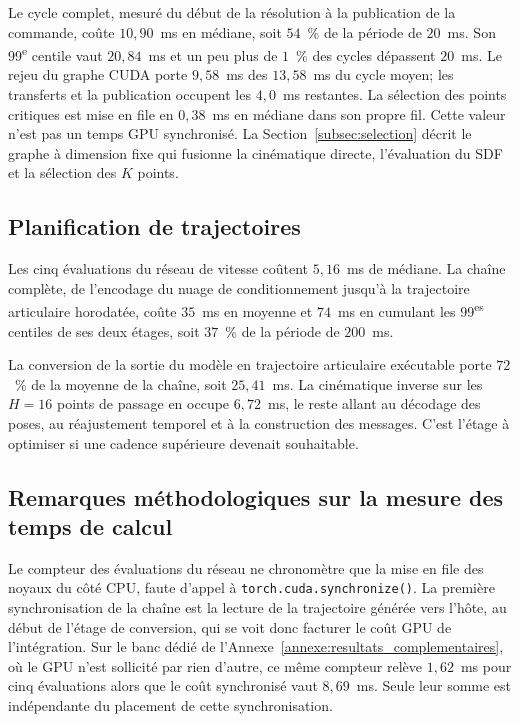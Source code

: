 Le cycle complet, mesuré du début de la résolution à la publication de la commande, coûte $10{,}90$~ms en médiane, soit $54$~\% de la période de $20$~ms. Son 99\textsuperscript{e} centile vaut $20{,}84$~ms et un peu plus de $1$~\% des cycles dépassent $20$~ms. Le rejeu du graphe \ac{CUDA} porte $9{,}58$~ms des $13{,}58$~ms du cycle moyen; les transferts et la publication occupent les $4{,}0$~ms restantes. La sélection des points critiques est mise en file en $0{,}38$~ms en médiane dans son propre fil. Cette valeur n'est pas un temps \ac{GPU} synchronisé. La Section~\ref{subsec:selection} décrit le graphe à dimension fixe qui fusionne la cinématique directe, l'évaluation du \ac{SDF} et la sélection des $K$ points.

\subsection*{Planification de trajectoires}
Les cinq évaluations du réseau de vitesse coûtent $5{,}16$~ms de médiane. La chaîne complète, de l'encodage du nuage de conditionnement jusqu'à la trajectoire articulaire horodatée, coûte $35$~ms en moyenne et $74$~ms en cumulant les 99\textsuperscript{es} centiles de ses deux étages, soit $37$~\% de la période de $200$~ms.

La conversion de la sortie du modèle en trajectoire articulaire exécutable porte $72$~\% de la moyenne de la chaîne, soit $25{,}41$~ms. La cinématique inverse sur les $H=16$ points de passage en occupe $6{,}72$~ms, le reste allant au décodage des poses, au réajustement temporel et à la construction des messages. C'est l'étage à optimiser si une cadence supérieure devenait souhaitable.

\subsection*{Remarques méthodologiques sur la mesure des temps de calcul}
Le compteur des évaluations du réseau ne chronomètre que la mise en file des noyaux du côté \ac{CPU}, faute d'appel à \texttt{torch.cuda.synchronize()}. La première synchronisation de la chaîne est la lecture de la trajectoire générée vers l'hôte, au début de l'étage de conversion, qui se voit donc facturer le coût \ac{GPU} de l'intégration. Sur le banc dédié de l'Annexe~\ref{annexe:resultats_complementaires}, où le \ac{GPU} n'est sollicité par rien d'autre, ce même compteur relève $1{,}62$~ms pour cinq évaluations alors que le coût synchronisé vaut $8{,}69$~ms. Seule leur somme est indépendante du placement de cette synchronisation.

